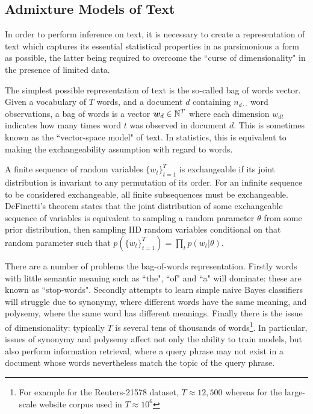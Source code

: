 

\subsection{Admixture Models of Text}
In order to perform inference on text, it is necessary to create a representation of text which captures its essential statistical properties in as parsimonious a form as possible, the latter being required to overcome the ``curse of dimensionality"\cite{Bishop2006} in the presence of limited data.

The simplest possible representation of text is the so-called bag of words vector. Given a vocabulary of $T$ words, and a document $d$ containing $n_{d\cdot\cdot}$ word observations, a bag of words is a vector $\bm w_d \in { \mathbb{N}^{T} }$ where each dimension $w_{dt}$ indicates how many times word $t$ was observed in document $d$. This is sometimes known as the ``vector-space model"\cite{Jst2004} of text. In statistics, this is equivalent to making the exchangeability assumption with regard to words. 

A finite sequence of random variables $\{w_t\}_{t=1}^{T}$ is exchangeable if its joint distribution is invariant to any permutation of its order. For an infinite sequence to be considered exchangeable, all finite subsequences must be exchangeable. DeFinetti's theorem\cite{Hewitt1955} states that the joint distribution of some exchangeable sequence of variables is equivalent to sampling a random parameter $\theta$ from some prior distribution, then sampling IID random variables conditional on that random parameter such that $p\left(\{w_t\}_{t=1}^{T}\right) = \prod_t p(w_t | \theta)$.

There are a number of problems the bag-of-words representation. Firstly words with little semantic meaning such as ``the", ``of" and ``a" will dominate: these are known as ``stop-words". Secondly attempts to learn simple naive Bayes classifiers\cite{Nigam2000} will struggle due to synonymy, where different words have the same meaning, and polysemy, where the same word has different meanings. Finally there is the issue of dimensionality: typically $T$ is several tens of thousands of words\footnote{For example for the Reuters-21578 dataset, $T\approx 12,500$ whereas for the large-scale website corpus used in\cite{Smola2010} $T \approx 10^6$}. In particular, issues of synonymy and polysemy affect not only the ability to train models, but also perform information retrieval, where a query phrase may not exist in a document whose words nevertheless match the topic of the query phrase.

